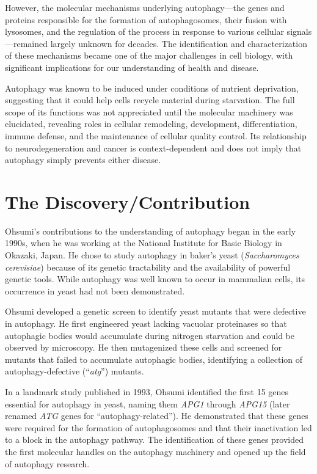 However, the molecular mechanisms underlying autophagy---the genes and proteins responsible for the formation of autophagosomes, their fusion with lysosomes, and the regulation of the process in response to various cellular signals---remained largely unknown for decades. The identification and characterization of these mechanisms became one of the major challenges in cell biology, with significant implications for our understanding of health and disease.

Autophagy was known to be induced under conditions of nutrient deprivation, suggesting that it could help cells recycle material during starvation. The full scope of its functions was not appreciated until the molecular machinery was elucidated, revealing roles in cellular remodeling, development, differentiation, immune defense, and the maintenance of cellular quality control. Its relationship to neurodegeneration and cancer is context-dependent and does not imply that autophagy simply prevents either disease.

\section{The Discovery/Contribution}

Ohsumi's contributions to the understanding of autophagy began in the early 1990s, when he was working at the National Institute for Basic Biology in Okazaki, Japan. He chose to study autophagy in baker's yeast (\textit{Saccharomyces cerevisiae}) because of its genetic tractability and the availability of powerful genetic tools. While autophagy was well known to occur in mammalian cells, its occurrence in yeast had not been demonstrated.

Ohsumi developed a genetic screen to identify yeast mutants that were defective in autophagy. He first engineered yeast lacking vacuolar proteinases so that autophagic bodies would accumulate during nitrogen starvation and could be observed by microscopy. He then mutagenized these cells and screened for mutants that failed to accumulate autophagic bodies, identifying a collection of autophagy-defective (``\textit{atg}'') mutants.

In a landmark study published in 1993, Ohsumi identified the first 15 genes essential for autophagy in yeast, naming them \textit{APG1} through \textit{APG15} (later renamed \textit{ATG} genes for ``autophagy-related''). He demonstrated that these genes were required for the formation of autophagosomes and that their inactivation led to a block in the autophagy pathway. The identification of these genes provided the first molecular handles on the autophagy machinery and opened up the field of autophagy research.

